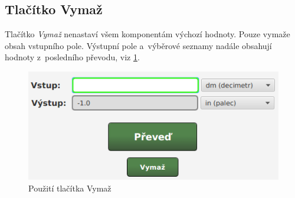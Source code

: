 		\subsection{Tlačítko Vymaž}
		Tlačítko \emph{Vymaž} nenastaví všem komponentám výchozí hodnoty. Pouze vymaže obsah vstupního pole. Výstupní pole a~výběrové seznamy nadále obsahují hodnoty z~posledního převodu, viz \ref{Vymazani}.
			\begin{figure}[ht!]
				\centering
				\caption{Použití tlačítka Vymaž}
				\label{Vymazani}
				\includegraphics[width=13.5cm]{img/Chyby/Vymazani.png}
			\end{figure}